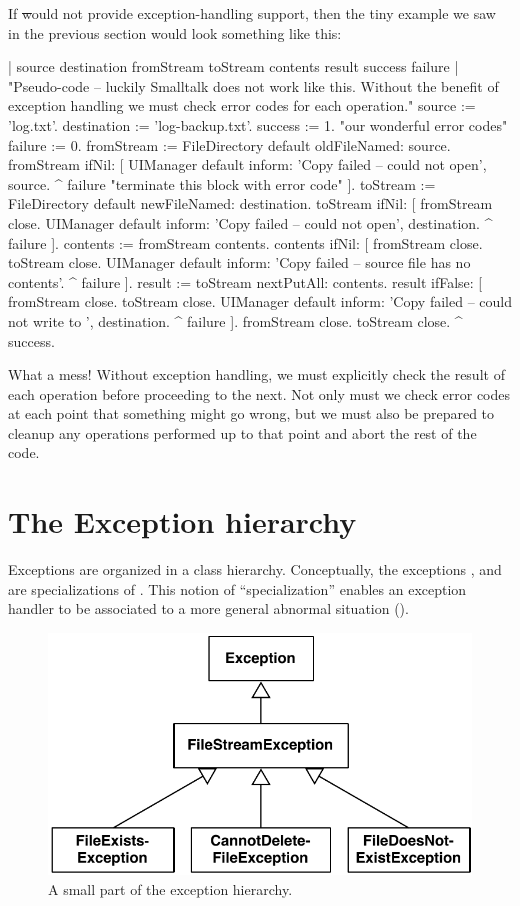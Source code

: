 \documentclass[a4paper,10pt,twoside]{book}
\begin{document}
If \st would not provide exception-handling support, then the tiny example we saw in the previous section would look something like this:

\begin{code}{| source destination fromStream toStream contents result success failure |}
"Pseudo-code -- luckily Smalltalk does not work like this. Without the 
benefit of exception handling we must check error codes for each operation."
source := 'log.txt'.
destination := 'log-backup.txt'.
success := 1. "our wonderful error codes"
failure := 0.
fromStream := FileDirectory default oldFileNamed: source.
fromStream ifNil: [
	UIManager default inform: 'Copy failed -- could not open', source.
	^ failure "terminate this block with error code" ].
toStream := FileDirectory default newFileNamed: destination.
toStream ifNil: [
	fromStream close.
	UIManager default inform: 'Copy failed -- could not open', destination.
	^ failure ].
contents := fromStream contents.
contents ifNil: [
	fromStream close.
	toStream close.
	UIManager default inform: 'Copy failed -- source file has no contents'.
	^ failure ].
result := toStream nextPutAll: contents.
result ifFalse: [
	fromStream close.
	toStream close.
	UIManager default inform: 'Copy failed -- could not write to ', destination.
	^ failure ].
fromStream close.
toStream close.
^ success.
\end{code}
\noindent
What a mess!
Without exception handling, we must explicitly check the result of each operation before proceeding to the next.
Not only must we check error codes at each point that something might go wrong, but we must also be prepared to cleanup any operations performed up to that point and abort the rest of the code.

\section{The Exception hierarchy}

Exceptions are organized in a class hierarchy. Conceptually, the exceptions ,  and  are specializations of . This notion of ``specialization'' enables an exception handler to be associated to a more general abnormal situation ().

\begin{figure}[ht]\centering
        \includegraphics[width=.5\linewidth]{SimpleHierarchy}
        \caption{A small part of the \pharo exception hierarchy.}
\end{figure}
\end{document}
